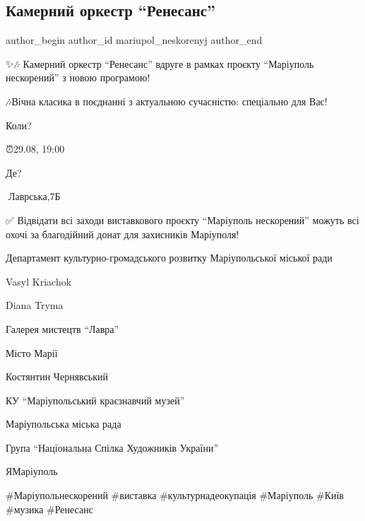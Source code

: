  
 
 
 
 

\subsection{Камерний оркестр \enquote{Ренесанс}}
\label{sec:28_08_2023.fb.mariupol_neskorenyj.1.kamernyj_orkestr_renesans}

\ifcmt
 author_begin
   author_id mariupol_neskorenyj
 author_end
\fi

✨️🎶 Камерний оркестр \enquote{Ренесанс} вдруге в рамках проєкту \enquote{Маріуполь нескорений} з новою програмою!\par
🎶Вічна класика в поєднанні з актуальною сучасністю: спеціально для Вас!\par
Коли? \par
⏰29.08, 19:00\par
Де?\par
📍Лаврська,7Б\par
✅ Відвідати всі заходи виставкового проєкту \enquote{Маріуполь нескорений} можуть всі охочі за благодійний донат для захисників Маріуполя!\par
Департамент культурно-громадського розвитку Маріупольської міської ради \par
Vasyl Kriachok\par
Diana Tryma\par
Галерея мистецтв \enquote{Лавра} \par
Місто Марії \par
Костянтин Чернявський \par
КУ \enquote{Маріупольський краєзнавчий музей} \par
Маріупольська міська рада \par
Група \enquote{Національна Спілка Художників України} \par
ЯМаріуполь \par
\#Маріупольнескорений \#виставка \#культурнадеокупація \#Маріуполь \#Київ \#музика \#Ренесанс\par
